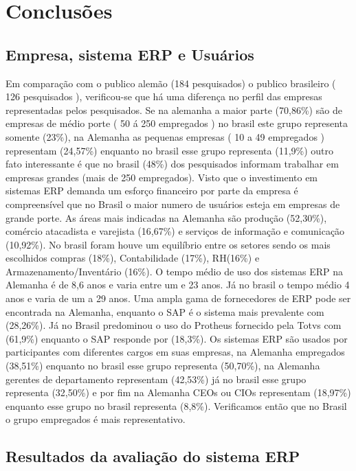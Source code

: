 \chapter{Conclusões} \label{Conclusões} 

\section{Empresa, sistema ERP e Usuários}

Em comparação com o publico alemão (184 pesquisados) o publico brasileiro ( 126 pesquisados ), verificou-se que há uma diferença no perfil das empresas representadas pelos pesquisados. Se na  alemanha a maior parte (70,86\%) são de empresas de médio porte ( 50 á 250 empregados ) no brasil este grupo representa somente (23\%), na Alemanha as pequenas empresas ( 10 a 49 empregados ) representam (24,57\%) enquanto no brasil esse grupo representa (11,9\%) outro fato interessante é que no brasil (48\%) dos  pesquisados informam trabalhar em empresas grandes (mais de 250 empregados). Visto que o investimento em sistemas ERP demanda um esforço financeiro por parte da empresa é compreensível que no Brasil o maior numero de usuários esteja em  empresas de grande porte.\newline
\indent As áreas mais indicadas na Alemanha são produção (52,30\%), comércio atacadista e varejista (16,67\%) e serviços de informação e comunicação (10,92\%). No brasil foram houve um equilíbrio entre os  setores sendo os mais escolhidos compras (18\%), Contabilidade (17\%), RH(16\%) e Armazenamento/Inventário (16\%). O tempo médio de uso dos sistemas ERP  na Alemanha é de 8,6 anos e varia entre um e 23 anos. Já no brasil o tempo médio 4 anos e varia de um a 29 anos. Uma ampla gama de fornecedores de ERP pode ser encontrada na Alemanha, enquanto o SAP é o sistema mais prevalente com (28,26\%). Já no Brasil predominou o uso do Protheus fornecido pela Totvs com (61,9\%) enquanto o SAP responde por (18,3\%).\newline
\indent Os sistemas ERP são usados por participantes com diferentes cargos em suas empresas, na Alemanha empregados (38,51\%) enquanto no brasil esse grupo representa (50,70\%), na Alemanha gerentes de departamento representam (42,53\%) já no brasil esse grupo representa (32,50\%) e por fim na Alemanha CEOs ou CIOs representam (18,97\%) enquanto esse grupo no brasil representa (8,8\%). Verificamos então que no Brasil o grupo empregados é mais representativo.

\section{Resultados da avaliação do sistema ERP}

